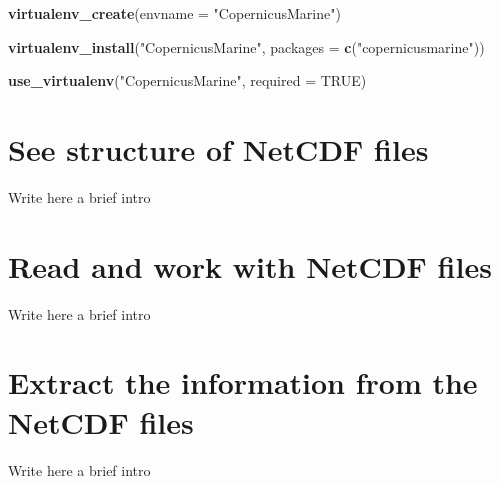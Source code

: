 \documentclass[
]{book}
\newenvironment{Shaded}{\begin{snugshade}}{\end{snugshade}}
\newcommand{\AttributeTok}[1]{\textcolor[rgb]{0.13,0.29,0.53}{#1}}
\newcommand{\ConstantTok}[1]{\textcolor[rgb]{0.56,0.35,0.01}{#1}}
\newcommand{\FunctionTok}[1]{\textcolor[rgb]{0.13,0.29,0.53}{\textbf{#1}}}
\newcommand{\NormalTok}[1]{#1}
\newcommand{\StringTok}[1]{\textcolor[rgb]{0.31,0.60,0.02}{#1}}
\begin{document}
\begin{Shaded}
\begin{Highlighting}[]
\FunctionTok{virtualenv\_create}\NormalTok{(}\AttributeTok{envname =} \StringTok{"CopernicusMarine"}\NormalTok{)}

\FunctionTok{virtualenv\_install}\NormalTok{(}\StringTok{"CopernicusMarine"}\NormalTok{, }\AttributeTok{packages =} \FunctionTok{c}\NormalTok{(}\StringTok{"copernicusmarine"}\NormalTok{))}

\FunctionTok{use\_virtualenv}\NormalTok{(}\StringTok{"CopernicusMarine"}\NormalTok{, }\AttributeTok{required =} \ConstantTok{TRUE}\NormalTok{)}
\end{Highlighting}
\end{Shaded}

\chapter{See structure of NetCDF files}\label{see-structure-of-netcdf-files}

Write here a brief intro

\chapter{Read and work with NetCDF files}\label{read-and-work-with-netcdf-files}

Write here a brief intro

\chapter{Extract the information from the NetCDF files}\label{extract-the-information-from-the-netcdf-files}

Write here a brief intro

  
\end{document}
